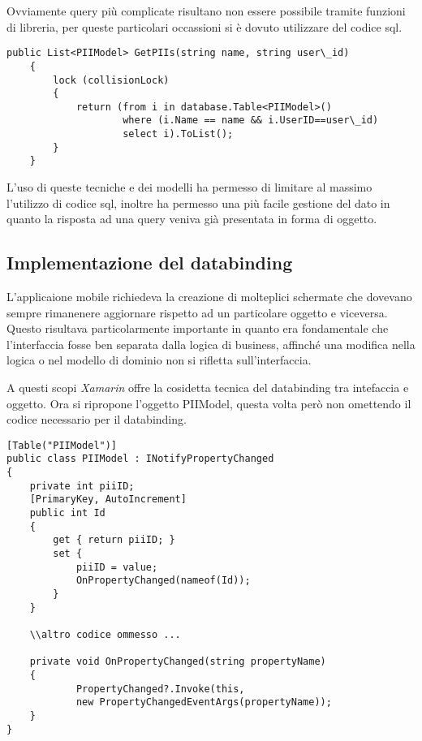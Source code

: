 Ovviamente query più complicate risultano non essere possibile tramite funzioni di libreria, per queste particolari occassioni si è dovuto utilizzare del codice sql.

\begin{lstlisting}[caption={Esempio di query sql}]
public List<PIIModel> GetPIIs(string name, string user\_id)
    {
        lock (collisionLock)
        {
            return (from i in database.Table<PIIModel>()
                    where (i.Name == name && i.UserID==user\_id)
                    select i).ToList();
        }
    }
\end{lstlisting}

L'uso di queste tecniche e dei modelli ha permesso di limitare al massimo l'utilizzo di codice sql, inoltre ha permesso una più facile gestione del dato in quanto la risposta ad una query veniva già presentata in forma di oggetto.

\subsection{Implementazione del databinding}
L'applicaione mobile richiedeva la creazione di molteplici schermate che dovevano sempre rimanenere aggiornare rispetto ad un particolare oggetto e viceversa. Questo risultava particolarmente importante in quanto era fondamentale che l’interfaccia fosse ben separata dalla logica di business, affinché una modifica nella logica o nel modello di dominio non si rifletta sull’interfaccia. 

A questi scopi \emph{Xamarin} offre la cosidetta tecnica del databinding tra intefaccia e oggetto. Ora si ripropone l'oggetto PIIModel, questa volta però non omettendo il codice necessario per il databinding.

\begin{lstlisting}[caption={esempio di oggetto in databinding}]
[Table("PIIModel")]
public class PIIModel : INotifyPropertyChanged
{
    private int piiID;
    [PrimaryKey, AutoIncrement]
    public int Id
    {
        get { return piiID; }
        set {
            piiID = value;
            OnPropertyChanged(nameof(Id));
        }
    }

    \\altro codice ommesso ...

    private void OnPropertyChanged(string propertyName)
    {
            PropertyChanged?.Invoke(this,
            new PropertyChangedEventArgs(propertyName));
    }
}
\end{lstlisting}

